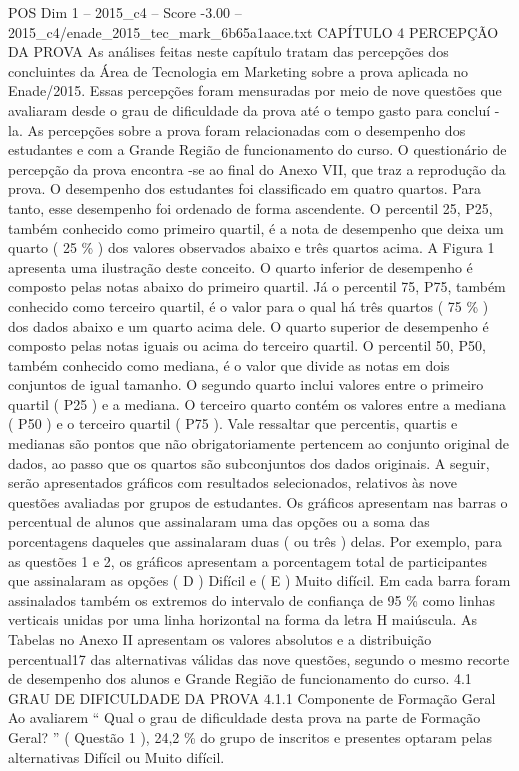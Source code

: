 \begin{textsample}{POS Dim 1 – 2015\_c4 – Score -3.00 – 2015\_c4/enade\_2015\_tec\_mark\_6b65a1aace.txt}  \label{ex:f1_pos_333}
CAPÍTULO 4 PERCEPÇÃO DA PROVA As análises feitas neste capítulo tratam das percepções dos concluintes da Área de Tecnologia em Marketing sobre a prova aplicada no Enade/2015.
Essas percepções foram mensuradas por meio de nove questões que avaliaram desde o grau de dificuldade da prova até o tempo gasto para concluí -la.
As percepções sobre a prova foram relacionadas com o desempenho dos estudantes e com a Grande Região de funcionamento do curso.
O questionário de percepção da prova encontra -se ao final do Anexo VII, que traz a reprodução da prova.
O desempenho dos estudantes foi classificado em quatro quartos.
Para tanto, esse desempenho foi ordenado de forma ascendente.
O percentil 25, P25, também conhecido como primeiro quartil, é a nota de desempenho que deixa um quarto ( 25 \% ) dos valores observados abaixo e três quartos acima.
A Figura 1 apresenta uma ilustração deste conceito.
O quarto inferior de desempenho é composto pelas notas abaixo do primeiro quartil.
Já o percentil 75, P75, também conhecido como terceiro quartil, é o valor para o qual há três quartos ( 75 \% ) dos dados abaixo e um quarto acima dele.
O quarto superior de desempenho é composto pelas notas iguais ou acima do terceiro quartil.
O percentil 50, P50, também conhecido como mediana, é o valor que divide as notas em dois conjuntos de igual tamanho.
O segundo quarto inclui valores entre o primeiro quartil ( P25 ) e a mediana.
O terceiro quarto contém os valores entre a mediana ( P50 ) e o terceiro quartil ( P75 ).
Vale ressaltar que percentis, quartis e medianas são pontos que não obrigatoriamente pertencem ao conjunto original de dados, ao passo que os quartos são subconjuntos dos dados originais.
A seguir, serão apresentados gráficos com resultados selecionados, relativos às nove questões avaliadas por grupos de estudantes.
Os gráficos apresentam nas barras o percentual de alunos que assinalaram uma das opções ou a soma das porcentagens daqueles que assinalaram duas ( ou três ) delas.
Por exemplo, para as questões 1 e 2, os gráficos apresentam a porcentagem total de participantes que assinalaram as opções ( D ) Difícil e ( E ) Muito difícil.
Em cada barra foram assinalados também os extremos do intervalo de confiança de 95 \% como linhas verticais unidas por uma linha horizontal na forma da letra H maiúscula.
As Tabelas no Anexo II apresentam os valores absolutos e a distribuição percentual17 das alternativas válidas das nove questões, segundo o mesmo recorte de desempenho dos alunos e Grande Região de funcionamento do curso. 4.1 GRAU DE DIFICULDADE DA PROVA 4.1.1 Componente de Formação Geral Ao avaliarem “ Qual o grau de dificuldade desta prova na parte de Formação Geral? ” ( Questão 1 ), 24,2 \% do grupo de inscritos e presentes optaram pelas alternativas Difícil ou Muito difícil.

\end{textsample}
